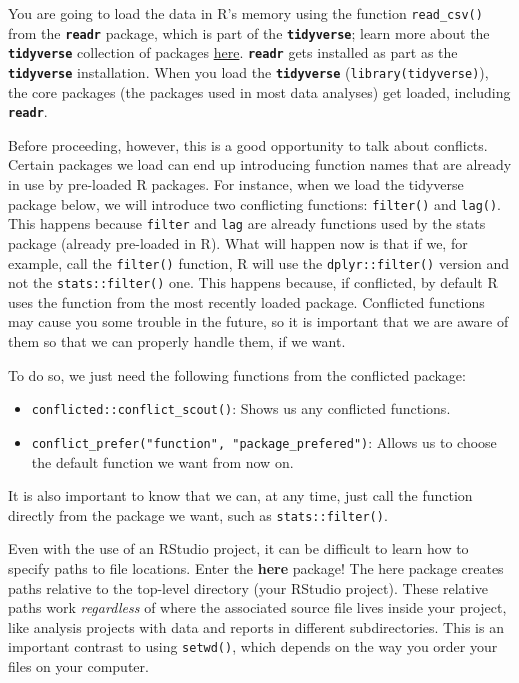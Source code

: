 \documentclass[
]{article}
\providecommand{\tightlist}{%
  \setlength{\itemsep}{0pt}\setlength{\parskip}{0pt}}
\begin{document}
You are going to load the data in R's memory using the function
\texttt{read\_csv()} from the \textbf{\texttt{readr}} package, which is
part of the \textbf{\texttt{tidyverse}}; learn more about the
\textbf{\texttt{tidyverse}} collection of packages
\href{https://www.tidyverse.org/}{here}. \textbf{\texttt{readr}} gets
installed as part as the \textbf{\texttt{tidyverse}} installation. When
you load the \textbf{\texttt{tidyverse}} (\texttt{library(tidyverse)}),
the core packages (the packages used in most data analyses) get loaded,
including \textbf{\texttt{readr}}.

Before proceeding, however, this is a good opportunity to talk about
conflicts. Certain packages we load can end up introducing function
names that are already in use by pre-loaded R packages. For instance,
when we load the tidyverse package below, we will introduce two
conflicting functions: \texttt{filter()} and \texttt{lag()}. This
happens because \texttt{filter} and \texttt{lag} are already functions
used by the stats package (already pre-loaded in R). What will happen
now is that if we, for example, call the \texttt{filter()} function, R
will use the \texttt{dplyr::filter()} version and not the
\texttt{stats::filter()} one. This happens because, if conflicted, by
default R uses the function from the most recently loaded package.
Conflicted functions may cause you some trouble in the future, so it is
important that we are aware of them so that we can properly handle them,
if we want.

To do so, we just need the following functions from the conflicted
package:

\begin{itemize}
\tightlist
\item
  \texttt{conflicted::conflict\_scout()}: Shows us any conflicted
  functions.\\
\item
  \texttt{conflict\_prefer("function",\ "package\_prefered")}: Allows us
  to choose the default function we want from now on.
\end{itemize}

It is also important to know that we can, at any time, just call the
function directly from the package we want, such as
\texttt{stats::filter()}.

Even with the use of an RStudio project, it can be difficult to learn
how to specify paths to file locations. Enter the \textbf{here} package!
The here package creates paths relative to the top-level directory (your
RStudio project). These relative paths work \emph{regardless} of where
the associated source file lives inside your project, like analysis
projects with data and reports in different subdirectories. This is an
important contrast to using \texttt{setwd()}, which depends on the way
you order your files on your computer.
\end{document}
